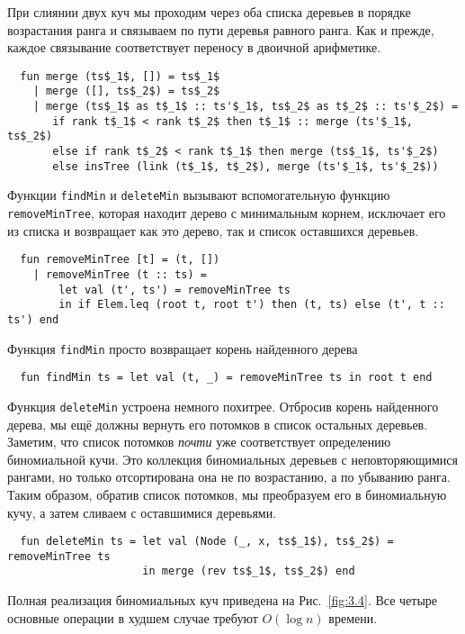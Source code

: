 При слиянии двух куч мы проходим через оба списка деревьев в порядке
возрастания ранга и связываем по пути деревья равного ранга. Как и
прежде, каждое связывание соответствует переносу в двоичной
арифметике.
\begin{lstlisting}
  fun merge (ts$_1$, []) = ts$_1$
    | merge ([], ts$_2$) = ts$_2$
    | merge (ts$_1$ as t$_1$ :: ts'$_1$, ts$_2$ as t$_2$ :: ts'$_2$) =
       if rank t$_1$ < rank t$_2$ then t$_1$ :: merge (ts'$_1$, ts$_2$)
       else if rank t$_2$ < rank t$_1$ then merge (ts$_1$, ts'$_2$)
       else insTree (link (t$_1$, t$_2$), merge (ts'$_1$, ts'$_2$))
\end{lstlisting}

Функции \lstinline!findMin! и \lstinline!deleteMin! вызывают
вспомогательную функцию \lstinline!removeMinTree!, которая находит
дерево с минимальным корнем, исключает его из списка и возвращает как
это дерево, так и список оставшихся деревьев.
\begin{lstlisting}
  fun removeMinTree [t] = (t, [])
    | removeMinTree (t :: ts) =
        let val (t', ts') = removeMinTree ts
        in if Elem.leq (root t, root t') then (t, ts) else (t', t :: ts') end
\end{lstlisting}
Функция \lstinline!findMin! просто возвращает корень найденного дерева
\begin{lstlisting}
  fun findMin ts = let val (t, _) = removeMinTree ts in root t end
\end{lstlisting}
Функция \lstinline!deleteMin! устроена немного похитрее. Отбросив
корень найденного дерева, мы ещё должны вернуть его потомков в список
остальных деревьев. Заметим, что список потомков \emph{почти} уже
соответствует определению биномиальной кучи. Это коллекция
биномиальных деревьев с неповторяющимися рангами, но только
отсортирована она не по возрастанию, а по убыванию ранга. Таким
образом, обратив список потомков, мы преобразуем его в биномиальную
кучу, а затем сливаем с оставшимися деревьями.
\begin{lstlisting}
  fun deleteMin ts = let val (Node (_, x, ts$_1$), ts$_2$) = removeMinTree ts
                     in merge (rev ts$_1$, ts$_2$) end
\end{lstlisting}
Полная реализация биномиальных куч приведена на
Рис.~\ref{fig:3.4}. Все четыре основные операции в худшем случае
требуют $O(\log n)$ времени.

